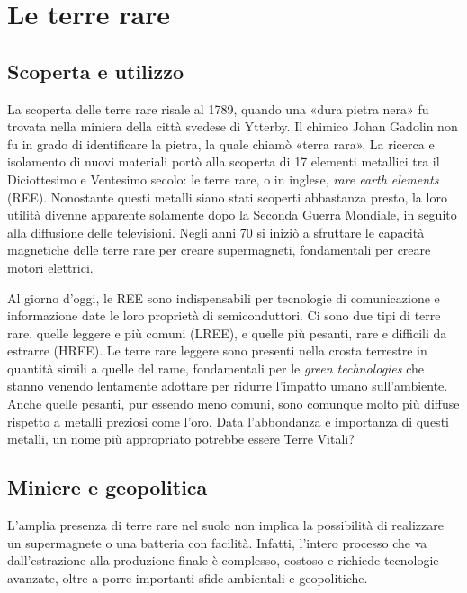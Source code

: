 \documentclass[12pt,a4paper,oneside]{book}
\begin{document}
\restoregeometry



\topmargin=-1cm
\tableofcontents

\raggedbottom


\chapter{Le terre rare}
\pagestyle{plain}
\setcounter{page}{1}

\section{Scoperta e utilizzo}
La scoperta delle terre rare risale al 1789, quando una «dura pietra nera» fu trovata nella miniera della città svedese di Ytterby. Il chimico Johan Gadolin non fu in grado di identificare la pietra, la quale chiamò «terra rara». La ricerca e isolamento di nuovi materiali portò alla scoperta di 17 elementi metallici tra il Diciottesimo e Ventesimo secolo: le terre rare, o in inglese, \textit{rare earth elements} (REE).
Nonostante questi metalli siano stati scoperti abbastanza presto, la loro utilità divenne apparente solamente dopo la Seconda Guerra Mondiale, in seguito alla diffusione delle televisioni. Negli anni 70 si iniziò a sfruttare le capacità magnetiche delle terre rare per creare supermagneti, fondamentali per creare motori elettrici.

Al giorno d'oggi, le REE sono indispensabili per tecnologie di comunicazione e informazione date le loro proprietà di semiconduttori. Ci sono due tipi di terre rare, quelle leggere e più comuni (LREE), e quelle più pesanti, rare e difficili da estrarre (HREE). Le terre rare leggere sono presenti nella crosta terrestre in quantità simili a quelle del rame, fondamentali per le \textit{green technologies} che stanno venendo lentamente adottare per ridurre l'impatto umano sull'ambiente. Anche quelle pesanti, pur essendo meno comuni, sono comunque molto più diffuse rispetto a metalli preziosi come l'oro.
Data l'abbondanza e importanza di questi metalli, un nome più appropriato potrebbe essere Terre Vitali?

\section{Miniere e geopolitica}
L'amplia presenza di terre rare nel suolo non implica la possibilità di realizzare un supermagnete o una batteria con facilità. Infatti, l'intero processo che va dall'estrazione alla produzione finale è complesso, costoso e richiede tecnologie avanzate, oltre a porre importanti sfide ambientali e geopolitiche.
\end{document}

